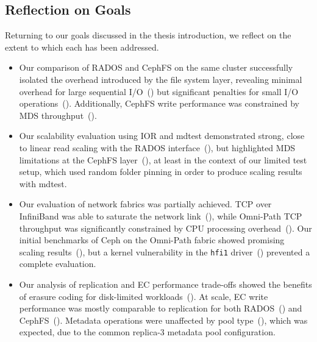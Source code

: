 \subsection{Reflection on Goals}
\label{sec:reflection-on-goals}

Returning to our goals discussed in the thesis introduction, we reflect on the extent to which each has been addressed.

\begin{itemize}
    \item Our comparison of \ac{RADOS} and \ac{CephFS} on the same cluster successfully isolated the overhead introduced by the file system layer, revealing minimal overhead for large sequential \ac{I/O}~() but significant penalties for small \ac{I/O} operations~(). Additionally, \ac{CephFS} write performance was constrained by \ac{MDS} throughput~().

    \item Our scalability evaluation using \ac{IOR} and mdtest demonstrated strong, close to linear read scaling with the \ac{RADOS} interface~(), but highlighted \ac{MDS} limitations at the \ac{CephFS} layer~(), at least in the context of our limited test setup, which used random folder pinning in order to produce scaling results with mdtest.

    \item Our evaluation of network fabrics was partially achieved. \ac{TCP} over InfiniBand was able to saturate the network link~(), while Omni-Path \ac{TCP} throughput was significantly constrained by \ac{CPU} processing overhead~(). Our initial benchmarks of Ceph on the Omni-Path fabric showed promising scaling results~(), but a kernel vulnerability in the \texttt{hfi1} driver~() prevented a complete evaluation.

    \item Our analysis of replication and \acl{EC} performance trade-offs showed the benefits of erasure coding for disk-limited workloads~(). At scale, \ac{EC} write performance was mostly comparable to replication for both \ac{RADOS}~() and \ac{CephFS}~(). Metadata operations were unaffected by pool type~(), which was expected, due to the common replica-3 metadata pool configuration.


\end{itemize}
